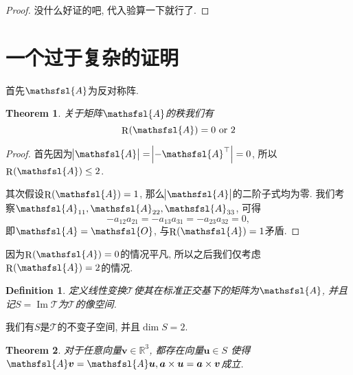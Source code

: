 \documentclass[a4paper,12pt]{ctexart}
\newtheorem{theorem}{Theorem}[section]
\theoremstyle{plain}
\theoremstyle{plain}
\newtheorem{definition}{Definition}[section]
\theoremstyle{plain}
\theoremstyle{nonumberplain}
\newtheorem{proof}{Proof}
\newcommand{\br}{\mathbb{R}}
\newcommand{\matr}[1]{\ensuremath{\mathsfsl{#1}}} %
\newcommand{\vect}[1]{\bm{#1}}
\DeclareMathOperator{\rank}{R}
\newcommand{\lntr}[1]{\mathscr{#1}}
\DeclareMathOperator{\image}{Im}
\begin{document}
    \begin{proof}
        没什么好证的吧, 代入验算一下就行了.
    \end{proof}




    \newpage
    \appendix

    \section{一个过于复杂的证明}

    首先$\matr{A}$为反对称阵.

    \begin{theorem}
        关于矩阵$\matr{A}$的秩我们有
        \begin{equation}
            \label{equation_rank}
            \rank(\matr{A}) = 0\ \text{or}\ 2
        \end{equation}
    \end{theorem}

    \begin{proof}
        首先因为$\abs{\matr{A}}=\abs{-\matr{A}^{\top}} = 0$,
        所以$\rank(\matr{A})\leq 2$.

        其次假设$\rank(\matr{A})=1$,
        那么$\abs{\matr{A}}$的二阶子式均为零.
        我们考察$\matr{A}_{11}, \matr{A}_{22}, \matr{A}_{33}$, 可得
        \begin{equation}
            \label{equation_subdeterminant}
            -a_{12}a_{21}=-a_{13}a_{31}=-a_{23}a_{32}=0,
        \end{equation}
        即$\matr{A}=\matr{O}$, 与$\rank(\matr{A})=1$矛盾.
    \end{proof}

    因为$\rank(\matr{A})=0$的情况平凡,
    所以之后我们仅考虑$\rank(\matr{A})=2$的情况.

    \begin{definition}
        定义线性变换$\lntr{T}$使其在标准正交基下的矩阵为$\matr{A}$,
        并且记$S=\image\lntr{T}$为$\lntr{T}$的像空间.
    \end{definition}

    我们有$S$是$\lntr{T}$的不变子空间, 并且$\dim{S}=2$.
    
    \begin{theorem}
        对于任意向量$\vect{v}\in\br^{3}$, 都存在向量$\vect{u}\in S$
        使得$\matr{A}\vect{v}=\matr{A}\vect{u},
        \vect{a}\times\vect{u}=\vect{a}\times\vect{v}$成立.
    \end{theorem}
\end{document}
